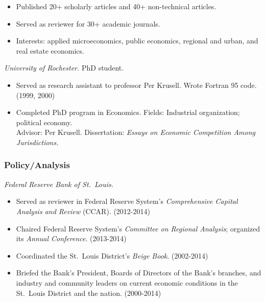 \documentclass[10pt,]{article}
\begin{document}
\begin{itemize}
\itemsep1pt\parskip0pt
\item
  Published 20+ scholarly articles and 40+ non-technical articles.
\item
  Served as reviewer for 30+ academic journals.
\item
  Interests: applied microeconomics, public economics, regional and
  urban, and real estate economics.
\end{itemize}

\begin{description}
\itemsep1pt\parskip0pt
\item[1995-2000]
\emph{University of Rochester.} PhD student.
\end{description}

\begin{itemize}
\itemsep1pt\parskip0pt
\item
  Served as research assistant to professor Per Krusell. Wrote Fortran
  95 code. (1999, 2000)
\item
  Completed PhD program in Economics. Fields: Industrial organization;
  political economy.\\ Advisor: Per Krusell. Dissertation: \emph{Essays
  on Economic Competition Among Jurisdictions.}
\end{itemize}

\subsubsection{Policy/Analysis}\label{policyanalysis}

\begin{description}
\itemsep1pt\parskip0pt
\item[2000-Present]
\emph{Federal Reserve Bank of St.~Louis.}
\end{description}

\begin{itemize}
\itemsep1pt\parskip0pt
\item
  Served as reviewer in Federal Reserve System's \emph{Comprehensive
  Capital Analysis and Review} (CCAR). (2012-2014)
\item
  Chaired Federal Reserve System's \emph{Committee on Regional
  Analysis}; organized its \emph{Annual Conference}. (2013-2014)
\item
  Coordinated the St.~Louis District's \emph{Beige Book}. (2002-2014)
\item
  Briefed the Bank's President, Boards of Directors of the Bank's
  branches, and industry and community leaders on current economic
  conditions in the St.~Louis District and the nation. (2000-2014)
\end{itemize}
\end{document}
